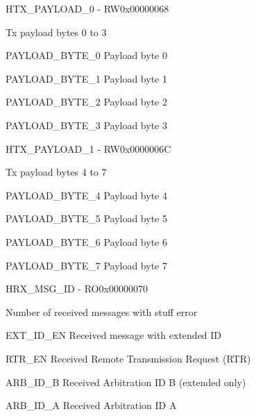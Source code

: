 \documentclass{article}
\begin{document}
\begin{register}{H}{TX{\_}PAYLOAD{\_}0 - RW}{0x00000068}  \par Tx payload bytes 0 to 3 \regnewline
  \label{TX_PAYLOAD_0}
\regnewline
  \begin{regdesc}\begin{reglist}
    \item [PAYLOAD{\_}BYTE{\_}0] Payload byte 0    \item [PAYLOAD{\_}BYTE{\_}1] Payload byte 1    \item [PAYLOAD{\_}BYTE{\_}2] Payload byte 2    \item [PAYLOAD{\_}BYTE{\_}3] Payload byte 3  \end{reglist}\end{regdesc}
\end{register}

\begin{register}{H}{TX{\_}PAYLOAD{\_}1 - RW}{0x0000006C}  \par Tx payload bytes 4 to 7 \regnewline
  \label{TX_PAYLOAD_1}
\regnewline
  \begin{regdesc}\begin{reglist}
    \item [PAYLOAD{\_}BYTE{\_}4] Payload byte 4    \item [PAYLOAD{\_}BYTE{\_}5] Payload byte 5    \item [PAYLOAD{\_}BYTE{\_}6] Payload byte 6    \item [PAYLOAD{\_}BYTE{\_}7] Payload byte 7  \end{reglist}\end{regdesc}
\end{register}

\begin{register}{H}{RX{\_}MSG{\_}ID - RO}{0x00000070}  \par Number of received messages with stuff error \regnewline
  \label{RX_MSG_ID}
\regnewline
  \begin{regdesc}\begin{reglist}[EXT{\_}ID{\_}EN]
    \item [EXT{\_}ID{\_}EN] Received message with extended ID    \item [RTR{\_}EN] Received Remote Transmission Request (RTR)    \item [ARB{\_}ID{\_}B] Received Arbitration ID B (extended only)    \item [ARB{\_}ID{\_}A] Received Arbitration ID A  \end{reglist}\end{regdesc}
\end{register}
\end{document}
